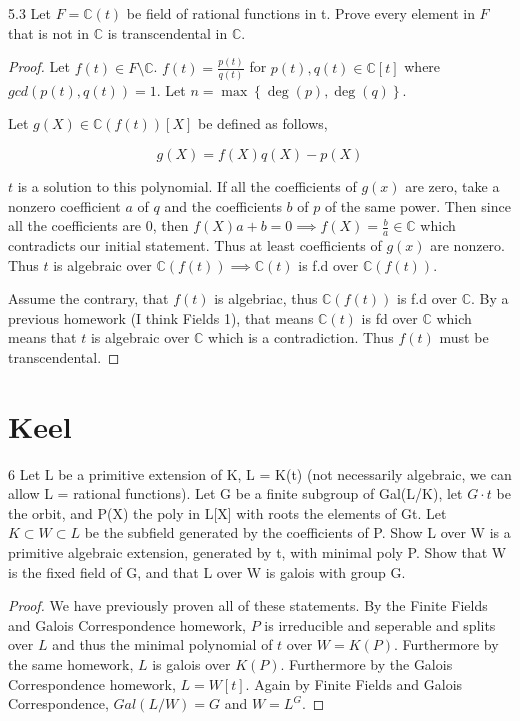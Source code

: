 \documentclass{article}
\newcommand{\C}{\mathbb{C}}
\begin{document}
\begin{PROB}{5.3}\label{Problem 5.3.}
    Let $F = \C(t)$ be field of rational functions in t. Prove every element in $F$ that is not in $\C$ is transcendental in $\C$.     
\end{PROB}
\begin{proof}
    Let $f(t) \in F \setminus \C$. $f(t) = \frac{p(t)}{q(t)}$ for $p(t), q(t) \in \C[t]$ where $gcd(p(t), q(t)) = 1$. Let $n = \max\left\{ \deg(p), \deg(q) \right\}$.
    
    Let $g(X) \in \C(f(t))[X]$ be defined as follows, 
    
    \begin{equation*}
        g(X) = f(X)q(X) - p(X)
    \end{equation*}
    
    $t$ is a solution to this polynomial. If all the coefficients of $g(x)$ are zero, take a nonzero coefficient $a$ of $q$ and the coefficients $b$ of $p$ of the same power. Then since all the coefficients are 0, then $f(X)a + b = 0 \implies f(X) = \frac{b}{a} \in \C$ which contradicts our initial statement. Thus at least coefficients of $g(x)$ are nonzero. Thus $t$ is algebraic over $\C(f(t)) \implies \C(t)$ is f.d over $\C(f(t)).$

    Assume the contrary, that $f(t)$ is algebriac, thus $\C(f(t))$ is f.d over $\C$. By a previous homework (I think Fields 1), that means $\C(t)$ is fd over $\C$ which means that $t$ is algebraic over $\C$ which is a contradiction. Thus $f(t)$ must be transcendental.         
\end{proof}

\bigskip

\section*{Keel}
\begin{PROB}{6}\label{Problem 6.}
    Let L be a primitive extension of K, L = K(t)  (not necessarily algebraic, we can allow L = rational functions).  Let G be a finite subgroup of Gal(L/K), let $G \cdot t$ be the orbit, and P(X) the poly in L[X] with roots the elements of Gt. Let  $K \subset W \subset L$ be the subfield generated by the coefficients of P. Show L over W is a primitive algebraic extension, generated by t, with minimal poly P.  Show that W is the fixed field of G, and that L over W is galois with group G.
\end{PROB}
\begin{proof}
    We have previously proven all of these statements. 
    By the Finite Fields and Galois Correspondence homework, $P$ is irreducible and seperable and splits over $L$ and thus the minimal polynomial of $t$ over $W = K(P)$. Furthermore by the same homework, $L$ is galois over $K(P)$. Furthermore by the Galois Correspondence homework, $L = W[t]$. Again by Finite Fields and Galois Correspondence, $Gal(L / W) = G$ and $W = L^G$.          
\end{proof}
\end{document}
